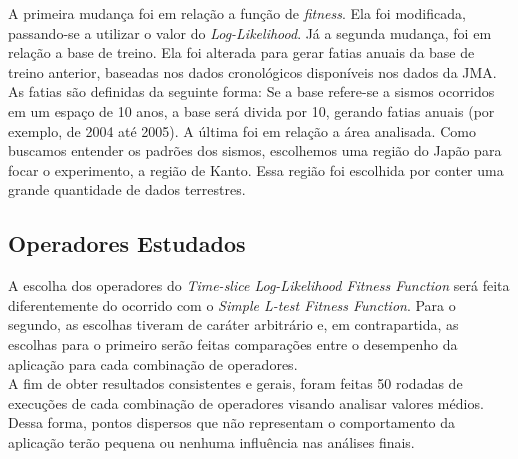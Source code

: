 A primeira mudança foi em relação a função de {\it fitness}. Ela foi modificada, passando-se a utilizar o valor do {\it Log-Likelihood}. Já a segunda mudança, foi em relação a base de treino. Ela foi alterada para gerar fatias anuais da base de treino anterior, baseadas nos dados cronológicos disponíveis nos dados da JMA. As fatias são definidas da seguinte forma: Se a base refere-se a sismos ocorridos em um espaço de 10 anos, a base será divida por 10, gerando fatias anuais (por exemplo, de 2004 até 2005). A última foi em relação a área analisada. Como buscamos entender os padrões dos sismos, escolhemos uma região do Japão para focar o experimento, a região de Kanto. Essa região foi escolhida por conter uma grande quantidade de dados terrestres.\\





\subsection{Operadores Estudados}
A escolha dos operadores do {\it Time-slice Log-Likelihood Fitness Function} será feita diferentemente do ocorrido com o {\it Simple L-test Fitness Function}. Para o segundo, as escolhas tiveram de caráter arbitrário e, em contrapartida, as escolhas para o primeiro serão feitas comparações entre o desempenho da aplicação para cada combinação de operadores. \\

A fim de obter resultados consistentes e gerais, foram feitas 50 rodadas de execuções de cada combinação de operadores visando analisar valores médios. Dessa forma, pontos dispersos que não representam o comportamento da aplicação terão pequena ou nenhuma influência nas análises finais. 

